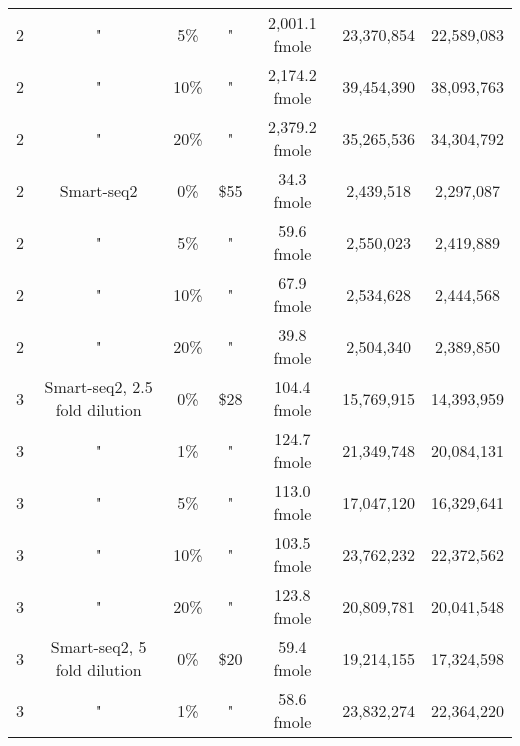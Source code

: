 \begin{table}[htdp]
\begin{center}
\begin{tabular}{|c|c|c|c|c|c|c|}
2 & " & 5\% & " & 2,001.1 fmole & 23,370,854 &22,589,083 \\
2 & " & 10\% & " & 2,174.2 fmole & 39,454,390 &38,093,763 \\
2 & " & 20\% & " & 2,379.2 fmole & 35,265,536 &34,304,792 \\
2 & Smart-seq2 & 0\% & \$55 & 34.3 fmole & 2,439,518 &2,297,087 \\
2 & " & 5\% & " & 59.6 fmole & 2,550,023 &2,419,889 \\
2 & " & 10\% & " & 67.9 fmole & 2,534,628 &2,444,568 \\
2 & " & 20\% & " & 39.8 fmole & 2,504,340 &2,389,850 \\
3 & Smart-seq2, 2.5 fold dilution & 0\% & \$28 & 104.4 fmole & 15,769,915 &14,393,959 \\
3 & " & 1\% & " & 124.7 fmole & 21,349,748 &20,084,131 \\
3 & " & 5\% & " & 113.0 fmole & 17,047,120 &16,329,641 \\
3 & " & 10\% & " & 103.5 fmole & 23,762,232 &22,372,562 \\
3 & " & 20\% & " & 123.8 fmole & 20,809,781 &20,041,548 \\
3 & Smart-seq2, 5 fold dilution & 0\% & \$20 & 59.4 fmole & 19,214,155 &17,324,598 \\
3 & " & 1\% & " & 58.6 fmole & 23,832,274 &22,364,220 \\

\end{tabular}
\end{center}
\end{table}
